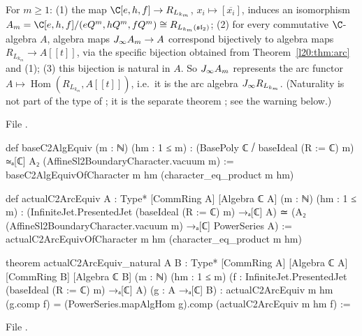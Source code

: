 \begin{theorem}\label{l20:thm:c2arc}
For $m\ge1$: (1) the map $\C[e,h,f]\to R_{L_{k_m}}$, $x_i\mapsto[\overline{x_i}]$, induces an isomorphism
$\ltwentyA=\C[e,h,f]/(e\ltwentyQ^m,h\ltwentyQ^m,f\ltwentyQ^m)\cong R_{L_{k_m}(\ltwentysl)}$; (2) for every commutative
$\C$-algebra $A$, algebra maps $J_\infty A_m\to A$ correspond bijectively to algebra maps
$R_{L_{k_m}}\to A[[t]]$, via the specific bijection obtained from Theorem~\ref{l20:thm:arc} and (1); (3) this bijection is natural in $A$. So
$J_\infty A_m$ represents the arc functor $A\mapsto\operatorname{Hom}(R_{L_{k_m}},A[[t]])$, i.e.\ it is the arc algebra
$J_\infty R_{L_{k_m}}$. (Naturality is not part of the type of ; it is the separate theorem
; see the warning below.)
\end{theorem}
\noindent File .
\begin{leancode}
def baseC2AlgEquiv (m : ℕ) (hm : 1 ≤ m) :
    (BasePoly ℂ ⧸ baseIdeal (R := ℂ) m) ≃ₐ[ℂ] A₂ (AffineSl2BoundaryCharacter.vacuum m) :=
  baseC2AlgEquivOfCharacter m hm (character_eq_product m hm)

def actualC2ArcEquiv {A : Type*} [CommRing A] [Algebra ℂ A]
    (m : ℕ) (hm : 1 ≤ m) :
    (InfiniteJet.PresentedJet (baseIdeal (R := ℂ) m) →ₐ[ℂ] A) ≃
      (A₂ (AffineSl2BoundaryCharacter.vacuum m) →ₐ[ℂ] PowerSeries A) :=
  actualC2ArcEquivOfCharacter m hm (character_eq_product m hm)

theorem actualC2ArcEquiv_natural {A B : Type*} [CommRing A] [Algebra ℂ A]
    [CommRing B] [Algebra ℂ B] (m : ℕ) (hm : 1 ≤ m)
    (f : InfiniteJet.PresentedJet (baseIdeal (R := ℂ) m) →ₐ[ℂ] A) (g : A →ₐ[ℂ] B) :
    actualC2ArcEquiv m hm (g.comp f) = (PowerSeries.mapAlgHom g).comp (actualC2ArcEquiv m hm f) :=
\end{leancode}
\noindent File .

